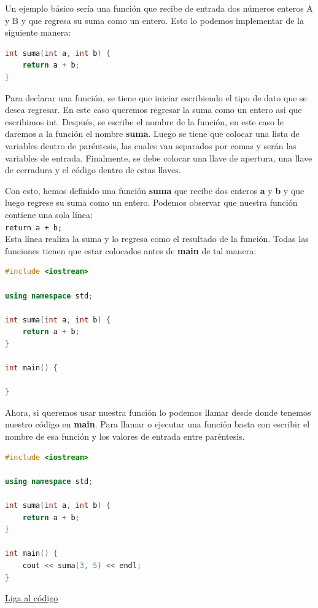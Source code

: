 \documentclass{article}
\begin{document}
Un ejemplo básico sería una función que recibe de entrada dos números enteros A y B y que regresa su suma como un entero. Esto lo podemos implementar de la siguiente manera:

\begin{lstlisting}[language=C++, title=Función de suma]
int suma(int a, int b) {
	return a + b;
}
\end{lstlisting}

Para declarar una función, se tiene que iniciar escribiendo el tipo de dato que se desea regresar. En este caso queremos regresar la suma como un entero asi que escribimos int. Después, se escribe el nombre de la función, en este caso le daremos a la función el nombre \textbf{suma}. Luego se tiene que colocar una lista de variables dentro de paréntesis, las cuales van separados por comas y serán las variables de entrada. Finalmente, se debe colocar una llave de apertura, una llave de cerradura y el código dentro de estas llaves.

Con esto, hemos definido una función \textbf{suma} que recibe dos enteros \textbf{a} y \textbf{b} y que luego regrese su suma como un entero. Podemos observar que nuestra función contiene una sola línea: \\

\lstinline{return a + b;} \\

Esta línea realiza la suma y lo regresa como el resultado de la función. Todas las funciones tienen que estar colocados antes de \textbf{main} de tal manera:

\begin{lstlisting}[language=C++, title=Función de suma]
#include <iostream>

using namespace std;

int suma(int a, int b) {
	return a + b;
}

int main() {

}
\end{lstlisting}

Ahora, si queremos usar nuestra función lo podemos llamar desde donde tenemos nuestro código en \textbf{main}. Para llamar o ejecutar una función basta con escribir el nombre de esa función y los valores de entrada entre paréntesis.

\begin{lstlisting}[language=C++, title=Función de suma]
#include <iostream>

using namespace std;

int suma(int a, int b) {
	return a + b;
}

int main() {
	cout << suma(3, 5) << endl;
}
\end{lstlisting}
\href{https://repl.it/@Jamesscn/Funciones}{Liga al código}\\
\end{document}
